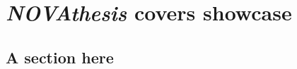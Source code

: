 
%

\chapter{\emph{NOVAthesis} covers showcase}
\label{app:covers_showcase}




\section{A section here}

